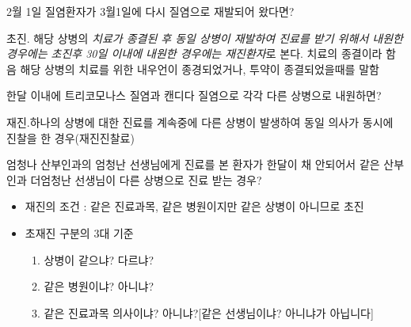 2월 1일 질염환자가 3월1일에 다시 질염으로 재발되어 왔다면? 
\begin{quotebox}
초진. 해당 상병의 \emph{치료가 종결된 후 동일 상병이 재발하여 진료를 받기 위해서 내원한 경우에는 초진후 30일 이내에 내원한 경우에는 재진환자}로 본다. 치료의 종결이라 함음 해당 상병의 치료를 위한 내우언이 종경되었거나, 투약이 종결되었을때를 말함
\end{quotebox}

한달 이내에 트리코모나스 질염과 캔디다 질염으로 각각 다른 상병으로 내원하면? 
\begin{quotebox}
재진.하나의 상병에 대한 진료를 계속중에 다른 상병이 발생하여 동일 의사가 동시에 진찰을 한 경우(재진진찰료)
\end{quotebox}

엄청나 산부인과의 엄청난 선생님에게 진료를 본 환자가 한달이 채 안되어서 같은 산부인과 더엄청난 선생님이 다른 상병으로 진료 받는 경우?
\begin{commentbox}{}
\begin{itemize}\tightlist
\item 재진의 조건 : 같은 진료과목, 같은 병원이지만 같은 상병이 아니므로 초진
\item 초재진 구분의 3대 기준 
	\begin{enumerate}\tightlist
	\item 상병이 같으냐? 다르냐?
	\item 같은 병원이냐? 아니냐?
	\item 같은 진료과목 의사이냐? 아니냐?[같은 선생님이냐? 아니냐가 아닙니다]
	\end{enumerate}
\end{itemize}
\end{commentbox}